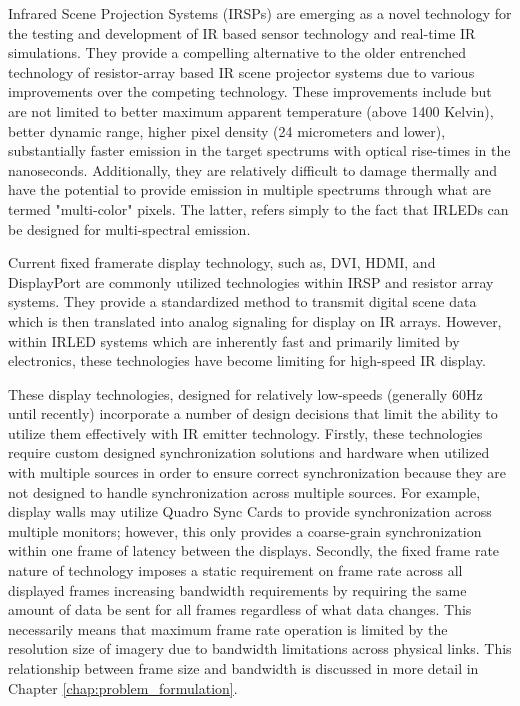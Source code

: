 \label{chap:introduction}

Infrared Scene Projection Systems (IRSPs) are emerging as a novel technology for the testing and development of IR based sensor technology and real-time IR simulations. They provide a compelling alternative to the older entrenched technology of resistor-array based IR scene projector systems\cite{pritchard1998design,williams2005history} due to various improvements over the competing technology. These improvements include but are not limited to better maximum apparent temperature (above 1400 Kelvin), better dynamic range, higher pixel density (24 micrometers and lower), substantially faster emission in the target spectrums with optical rise-times in the nanoseconds. Additionally, they are relatively difficult to damage thermally and have the potential to provide emission in multiple spectrums through what are termed "multi-color" pixels. The latter, refers simply to the fact that IRLEDs can be designed for multi-spectral emission.

Current fixed framerate display technology, such as, DVI\cite{DDWG1999}, HDMI\cite{HDMIForum2018}, and DisplayPort\cite{BhowmikEtAl2012} are commonly utilized technologies within IRSP and resistor array systems. They provide a standardized method to transmit digital scene data which is then translated into analog signaling for display on IR arrays. However, within IRLED systems which are inherently fast and primarily limited by electronics, these technologies have become limiting for high-speed IR display\cite{EjzakEtAl2016,LaVeignePrewarski2013}.

These display technologies, designed for relatively low-speeds (generally 60Hz until recently) incorporate a number of design decisions that limit the ability to utilize them effectively with IR emitter technology. Firstly, these technologies require custom designed synchronization solutions and hardware when utilized with multiple sources in order to ensure correct synchronization because they are not designed to handle synchronization across multiple sources. For example, display walls may utilize Quadro Sync Cards\cite{NVIDIAQuadroSync} to provide synchronization across multiple monitors; however, this only provides a coarse-grain synchronization within one frame of latency between the displays. Secondly, the fixed frame rate nature of technology imposes a static requirement on frame rate across all displayed frames increasing bandwidth requirements by requiring the same amount of data be sent for all frames regardless of what data changes. This necessarily means that maximum frame rate operation is limited by the resolution size of imagery due to bandwidth limitations across physical links. This relationship between frame size and bandwidth is discussed in more detail in Chapter \ref{chap:problem_formulation}.


